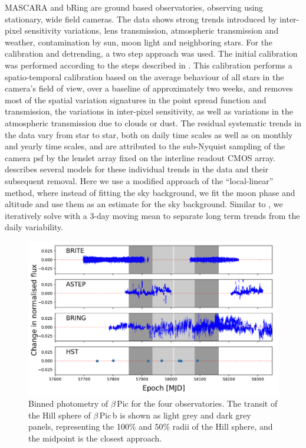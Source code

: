 \documentclass[longauth]{aa} %
\newcommand{\bpb}{$\beta$\,Pic\,b}
\newcommand{\bp}{$\beta$\,Pic}
\begin{document}
MASCARA and bRing are ground based observatories, observing using stationary, wide field cameras.
%
The data shows strong trends introduced by inter-pixel sensitivity variations, lens transmission, atmospheric transmission and weather, contamination by sun, moon light and neighboring stars.
%
For the calibration and detrending, a two step approach was used.
%
The initial calibration was performed according to the steps described in \citet{talens2018}.
%
This calibration performs a spatio-temporal calibration based on the average behaviour of all stars in the camera's field of view, over a baseline of approximately two weeks, and removes most of the spatial variation signatures in the point spread function and transmission, the variations in inter-pixel sensitivity, as well as variations in the atmospheric transmission due to clouds or dust. 
%
The residual systematic trends in the data vary from star to star, both on daily time scales as well as on monthly and yearly time scales, and are attributed to the sub-Nyquist sampling of the camera \ac{psf} by the lenslet array fixed on the interline readout CMOS array.
%
\citet{talens2018} describes several models for these individual trends in the data and their subsequent removal.
%
Here we use a modified approach of the ``local-linear'' method, where instead of fitting the sky background, we fit the moon phase and altitude and use them as an estimate for the sky background.
%
Similar to \cite{talens2018}, we iteratively solve with a 3-day moving mean to separate long term trends from the daily variability.
%


\begin{figure}[htb]
\centering
\includegraphics[width=1.0\textwidth]{all_binned_photometry.pdf}
\caption{Binned photometry of \bp{} for the four observatories. The transit of the Hill sphere of \bpb{} is shown as light grey and dark grey panels, representing the 100\% and 50\% radii of the Hill sphere, and the midpoint is the closest approach.}
\label{fig:binnedphot}
\end{figure}
\end{document}
